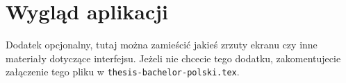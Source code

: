 \chapter{Wygląd aplikacji}
\label{Chapterb1}

Dodatek opcjonalny, tutaj można zamieścić jakieś zrzuty ekranu czy inne materiały dotyczące interfejsu. Jeżeli nie chcecie tego dodatku, zakomentujecie załączenie tego pliku w \texttt{thesis-bachelor-polski.tex}.